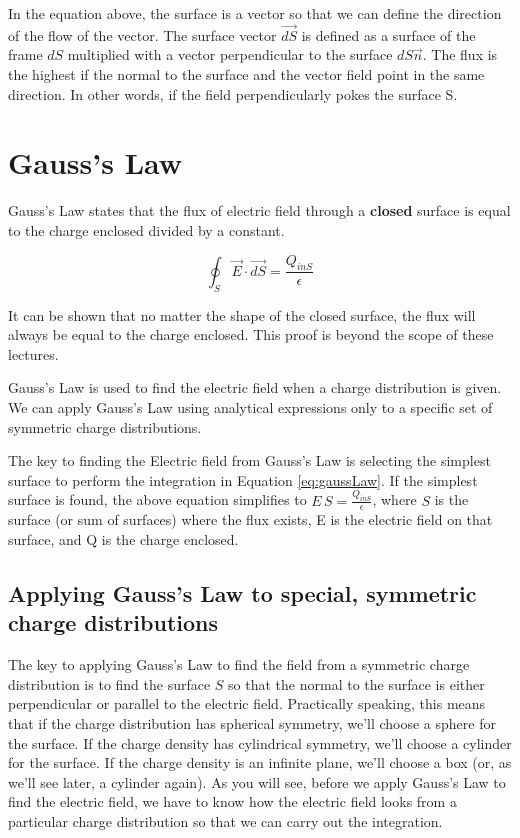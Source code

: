 \documentclass{ximera}
\begin{document}
In the equation above, the surface is a vector so that we can define the direction of the flow of the vector. The surface vector $\vec{dS}$ is defined as a surface of the frame $dS$ multiplied with a vector perpendicular to the surface $dS \vec{n}$. The flux is the highest if the normal to the surface and the vector field point in the same direction. In other words, if the field perpendicularly pokes the surface S.


\section{Gauss's Law}


Gauss's Law states that the flux of electric field through a {\bf closed} surface is equal to the charge enclosed divided by a constant.

\begin{equation}
\oint_S \vec{E} \cdot \vec{dS} = \frac{Q_{inS}}{\epsilon}\label{eq:gaussLaw}
\end{equation}


It can be shown that no matter the shape of the closed surface, the flux will always be equal to the charge enclosed. This proof is beyond the scope of these lectures.


Gauss's Law is used to find the electric field when a charge distribution is given. We can apply Gauss's Law using analytical expressions only to a specific set of symmetric charge distributions.


 The key to finding the Electric field from Gauss's Law is selecting the simplest surface to perform the integration in Equation \ref{eq:gaussLaw}. If the simplest surface is found, the above equation simplifies to $E \, S = \frac{Q_{inS}}{\epsilon}$, where $S$ is the surface (or sum of surfaces) where the flux exists, E is the electric field on that surface, and Q is the charge enclosed.

\subsection{Applying Gauss's Law to special, symmetric charge distributions} 

The key to applying Gauss's Law to find the field from a symmetric charge distribution is to find the surface $S$ so that the normal to the surface is either perpendicular or parallel to the electric field. Practically speaking, this means that if the charge distribution has spherical symmetry, we'll choose a sphere for the surface. If the charge density has cylindrical symmetry, we'll choose a cylinder for the surface. If the charge density is an infinite plane, we'll choose a box (or, as we'll see later, a cylinder again). As you will see, before we apply Gauss's Law to find the electric field, we have to know how the electric field looks from a particular charge distribution so that we can carry out the integration.
\end{document}
